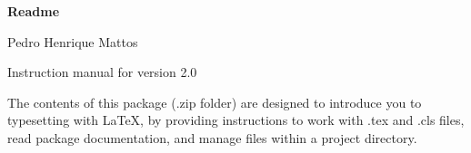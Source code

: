 \documentclass[10pt, a4paper]{article}
\begin{document}
\begin{center}
{\Huge\bfseries\normalfont Readme}
\par
Pedro Henrique Mattos
\par
Instruction manual for version 2.0
\end{center}



The contents of this package (.zip folder) are designed to introduce you to typesetting with \LaTeX, by providing instructions to work with .tex and .cls files, read package documentation, and manage files within a project directory. \par


\tableofcontents

\clearpage










\end{document}

